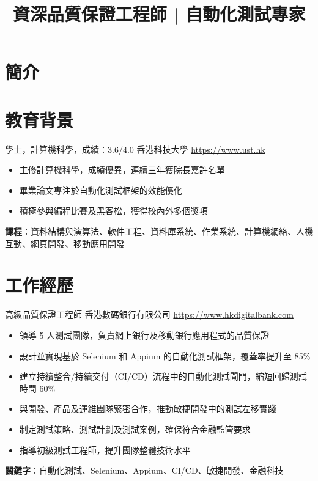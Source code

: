 \documentclass[a4paper, serif, 10pt]{moderncv}
\title{資深品質保證工程師 | 自動化測試專家}
\begin{document}
\maketitle

\section{簡介}

\section{教育背景}

        {學士，計算機科學，成績：3.6/4.0}
        {香港科技大學}
        {\url{https://www.ust.hk}}
        {}
        {\begin{itemize}
\item 主修計算機科學，成績優異，連續三年獲院長嘉許名單
\item 畢業論文專注於自動化測試框架的效能優化
\item 積極參與編程比賽及黑客松，獲得校內外多個獎項
\end{itemize}
\textbf{課程}：資料結構與演算法、軟件工程、資料庫系統、作業系統、計算機網絡、人機互動、網頁開發、移動應用開發}
\section{工作經歷}

        {高級品質保證工程師}
        {香港數碼銀行有限公司}
        {\url{https://www.hkdigitalbank.com}}
        {}
        {\begin{itemize}
\item 領導 5 人測試團隊，負責網上銀行及移動銀行應用程式的品質保證
\item 設計並實現基於 Selenium 和 Appium 的自動化測試框架，覆蓋率提升至 85\%
\item 建立持續整合/持續交付（CI/CD）流程中的自動化測試閘門，縮短回歸測試時間 60\%
\item 與開發、產品及運維團隊緊密合作，推動敏捷開發中的測試左移實踐
\item 制定測試策略、測試計劃及測試案例，確保符合金融監管要求
\item 指導初級測試工程師，提升團隊整體技術水平
\end{itemize}
\textbf{關鍵字}：自動化測試、Selenium、Appium、CI/CD、敏捷開發、金融科技}
\end{document}
